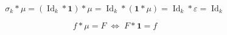 \[
\sigma_k * \mu = (\operatorname{Id}_k * \mathbf{1}) * \mu = \operatorname{Id}_k * (\mathbf{1} * \mu) = \operatorname{Id}_k * \varepsilon = \operatorname{Id}_k
\]

\[
f * \mu = F \;\Longleftrightarrow\; F * \mathbf{1} = f
\]